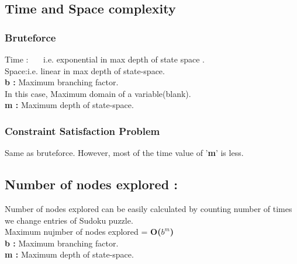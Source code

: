 \documentclass[11pt]{article}
\newcommand\tab[1][1cm]{\hspace*{#1}}
\begin{document}
\subsection{Time and Space complexity}
\subsubsection{Bruteforce }
\tab Time \tab:\tab  {\Large \textbf{O(}Nx\(b^m\)\textbf{)}} \ \ \ i.e. exponential in max depth of state space .\\
\tab Space\tab:\tab  {\Large \textbf{O(}bm\textbf{)}}\tab i.e. linear in max depth of state-space.\\
\linebreak
\textbf{b :} Maximum branching factor.\\
\linebreak
\tab In this case, Maximum domain of a variable(blank).\\
\linebreak
\textbf{m :} Maximum depth of state-space.\\
\subsubsection{Constraint Satisfaction Problem}
\tab Same as bruteforce. However, most of the time value of '\textbf{m}' is less.
\subsection{Number of nodes explored :}
Number of nodes explored can be easily calculated by counting number of times we change entries of Sudoku puzzle.\\
\linebreak
Maximum nujmber of nodes explored = {\Large \textbf{O(\(b^m\))}}\\
\linebreak
\textbf{b :} Maximum branching factor.\\
\linebreak
\textbf{m :} Maximum depth of state-space.\\
\end{document}
